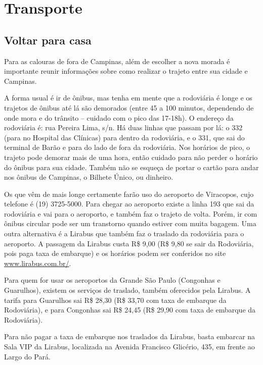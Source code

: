 
\section{Transporte}
\subsection{Voltar para casa}

Para as calouras de fora de Campinas, além de escolher a nova morada é
importante reunir informações sobre como realizar o trajeto entre sua cidade e
Campinas.

A forma usual é ir de ônibus, mas tenha em mente que a rodoviária é longe e os
trajetos de ônibus até lá são demorados (entre 45 a 100 minutos, dependendo de
onde mora e do trânsito -- cuidado com o pico das 17-18h). O endereço da
rodoviária é: rua Pereira Lima, s/n. Há duas linhas que passam por lá: o 332
(para no Hospital das Clínicas) para dentro da rodoviária, e o 331, que sai do
terminal de Barão e para do lado de fora da rodoviária. Nos horários de pico, o
trajeto pode demorar mais de uma hora, então cuidado para não perder o horário
do ônibus para sua cidade. Também não se esqueça de portar o cartão para andar
nos ônibus de Campinas, o Bilhete Único, ou dinheiro.

Os que vêm de mais longe certamente farão uso do aeroporto de Viracopos, cujo
telefone é (19) 3725-5000. Para chegar ao aeroporto existe a linha 193 que sai
da rodoviária e vai para o aeroporto, e também faz o trajeto de volta. Porém,
ir com ônibus circular pode ser um transtorno quando estiver com muita bagagem.
Uma outra alternativa é a Lirabus que também faz o traslado da rodoviária para
o aeroporto. A passagem da Lirabus custa R\$ 9,00 (R\$ 9,80 se sair da
Rodoviária, pois paga taxa de embarque) e os horários podem ser conferidos no
site \url{www.lirabus.com.br/}.

Para quem for usar os aeroportos da Grande São Paulo (Congonhas e Guarulhos),
existem os serviços de traslado, também oferecidos pela Lirabus. A tarifa para
Guarulhos sai R\$ 28,30 (R\$ 33,70 com taxa de embarque da Rodoviária), e para
Congonhas sai R\$ 24,45 (R\$ 29,90 com taxa de embarque da Rodoviária).

Para não pagar a taxa de embarque nos traslados da Lirabus, basta embarcar na
Sala VIP da Lirabus, localizada na Avenida Francisco Glicério, 435, em frente
ao Largo do Pará.

